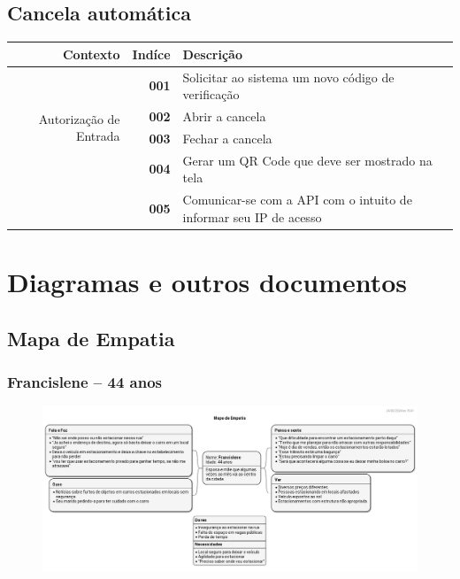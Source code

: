 \documentclass[a4paper,12pt]{article}
\begin{document}
\subsection{Cancela automática}

\begin{table}[H]
    \begin{tabularx}{\linewidth}{ | r | r | X | }
        \hline
        \bf{Contexto} &\bf{Indíce}& \bf{Descrição} \\
        \hline
        \multirow{4}{7.5em}{Autorização de Entrada}  
            & \bf{001} & Solicitar ao sistema um novo código de verificação \\ \cline{2-3}
            & \bf{002} & Abrir a cancela \\ \cline{2-3}
            & \bf{003} & Fechar a cancela \\ \cline{2-3}
            & \bf{004} & Gerar um QR Code que deve ser mostrado na tela \\ 
            & \bf{005} & Comunicar-se com a API com o intuito de informar seu IP de acesso \\
        \hline
    \end{tabularx}
\end{table}

\pagebreak

\section{Diagramas e outros documentos}

\subsection{Mapa de Empatia}

\subsubsection{Francislene -- 44 anos}
\begin{figure}[htbp]
    \centerline{\includegraphics[width=\linewidth]{build/mapa_de_empatia_1_fran.png}}
\end{figure}


 \newpage
 
 
\end{document}
